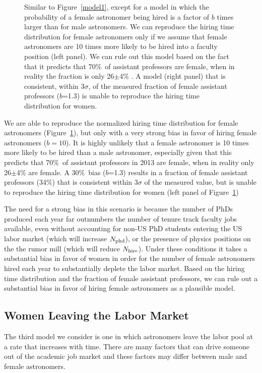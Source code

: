 \documentclass[modern]{aastex62}
\begin{document}
\begin{figure}[!hbt]
\caption{Similar to Figure~\ref{model1}, except for a model in which the probability of a female astronomer being hired is a factor of $b$ times larger than for male astronomers. We can reproduce the hiring time distribution for female astronomers only if we assume that female astronomers are 10 times more likely to be hired into a faculty position (left panel). We can rule out this model based on the fact that it predicts that 70\%\ of assistant professors are female, when in reality the fraction is only 26$\pm$4\% \citep{hug14}. A model (right panel) that is consistent, within 3$\sigma$, of the measured fraction of female assistant professors ($b$=1.3) is unable to reproduce the hiring time distribution for women. \label{model2_b10}}
\end{figure}

We are able to reproduce the normalized hiring time distribution for female astronomers (Figure~\ref{model2_b10}), but only with a very strong bias in favor of hiring female astronomers ($b=10$). It is highly unlikely that a female astronomer is 10 times more likely to be hired than a male astronomer, especially given that this predicts that 70\%\ of assistant professors in 2013 are female, when in reality only 26$\pm$4\% are female. A 30\%\ bias ($b$=1.3) results in a fraction of female assistant professors (34\%) that is consistent within 3$\sigma$ of the measured value, but is unable to reproduce the hiring time distribution for women (left panel of Figure~\ref{model2_b10}) 

The need for a strong bias in this scenario is because the number of PhDs produced each year far outnumbers the number of tenure track faculty jobs available, even without accounting for non-US PhD students entering the US labor market (which will increase $N_{\rm phd}$), or the presence of physics positions on the the rumor mill (which will reduce $N_{\rm hire}$). Under these conditions it takes a substantial bias in favor of women in order for the number of female astronomers hired each year to substantially deplete the labor market. Based on the hiring time distribution and the fraction of female assistant professors, we can rule out a substantial bias in favor of hiring female astronomers as a plausible model. 

\subsection{Women Leaving the Labor Market}
The third model we consider is one in which astronomers leave the labor pool at a rate that increases with time. There are many factors that can drive someone out of the academic job market and these factors may differ between male and female astronomers.
\end{document}
